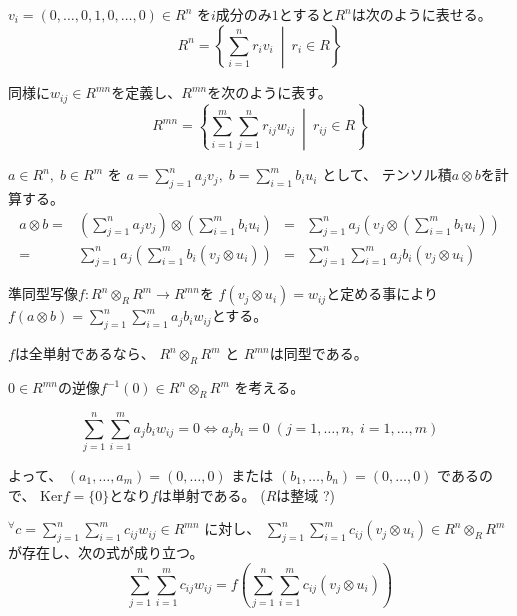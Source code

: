 \documentclass[12pt,b5paper]{ltjsarticle}
\begin{document}
\begin{enumerate}
      $v_{i}=(0,\dots,0,1,0,\dots,0) \in R^{n}$
      を$i$成分のみ$1$とすると$R^{n}$は次のように表せる。
      \begin{equation}
       R^{n} = \left \{ \sum_{i=1}^{n} r_{i}v_{i} \:\middle|\: r_{i} \in R \right \}
      \end{equation}

      同様に$w_{ij}\in R^{mn}$を定義し、$R^{mn}$を次のように表す。
      \begin{equation}
       R^{mn} = \left \{ \sum_{i=1}^{m} \sum_{j=1}^{n} r_{ij}w_{ij} \:\middle|\: r_{ij} \in R \right \}
      \end{equation}

      $a\in R^{n}, \; b\in R^{m}$
      を
      $a=\sum_{j=1}^{n}a_{j}v_{j}, \; b=\sum_{i=1}^{m}b_{i}u_{i}$
      として、
      テンソル積$a\otimes b$を計算する。
      \begin{align}
       a\otimes b =& \left( \sum_{j=1}^{n}a_{j}v_{j} \right) \otimes \left( \sum_{i=1}^{m}b_{i}u_{i} \right) &
       =& \sum_{j=1}^{n} a_{j} \left( v_{j} \otimes \left( \sum_{i=1}^{m}b_{i}u_{i} \right)\right)\\
       =& \sum_{j=1}^{n} a_{j} \left(  \sum_{i=1}^{m}b_{i} \left( v_{j} \otimes u_{i} \right)\right) &
       =& \sum_{j=1}^{n} \sum_{i=1}^{m} a_{j} b_{i} \left( v_{j} \otimes u_{i} \right)
      \end{align}


      準同型写像$f: R^{n}\otimes_{R} R^{m} \to R^{mn}$を
      $f(v_{j} \otimes u_{i}) = w_{ij}$と定める事により
      $f(a\otimes b) = \sum_{j=1}^{n} \sum_{i=1}^{m} a_{j} b_{i} w_{ij}$とする。

      $f$は全単射であるなら、
      $R^{n}\otimes_{R} R^{m}$
      と $R^{mn}$は同型である。


      $0\in R^{mn}$の逆像$f^{-1}(0)\in R^{n}\otimes_{R} R^{m}$
      を考える。

      \begin{equation}
       \sum_{j=1}^{n} \sum_{i=1}^{m} a_{j} b_{i} w_{ij} = 0
        \Longleftrightarrow a_{j} b_{i} = 0 \; (j=1,\dots,n,\; i=1,\dots,m)
      \end{equation}

      よって、
      $(a_{1},\dots,a_{m})=(0,\dots,0)$
      または
      $(b_{1},\dots,b_{n})=(0,\dots,0)$
      であるので、
      $\mathrm{Ker}f=\{0\}$となり$f$は単射である。
      \qquad ($R$は整域 ?)

      ${}^{\forall} c =\sum_{j=1}^{n} \sum_{i=1}^{m} c_{ij}w_{ij} \in R^{mn}$
      に対し、
      $\sum_{j=1}^{n} \sum_{i=1}^{m} c_{ij} \left( v_{j}\otimes u_{i} \right) \in R^{n} \otimes_{R} R^{m}$
      が存在し、次の式が成り立つ。
      \begin{equation}
       \sum_{j=1}^{n} \sum_{i=1}^{m} c_{ij}w_{ij}
        = f\left(
            \sum_{j=1}^{n} \sum_{i=1}^{m} c_{ij} (v_{j}\otimes u_{i})
           \right)
      \end{equation}


\end{enumerate}
\end{document}
